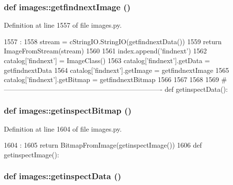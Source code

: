 \hypertarget{namespaceimages_a8bf08ffd31da9168b3f793df37e9dc76}{
\subsubsection[{getfindnextImage}]{\setlength{\rightskip}{0pt plus 5cm}def images::getfindnextImage ()}}
\label{namespaceimages_a8bf08ffd31da9168b3f793df37e9dc76}


Definition at line 1557 of file images.py.


\begin{DoxyCode}
1557                       :
1558     stream = cStringIO.StringIO(getfindnextData())
1559     return ImageFromStream(stream)
1560 
1561 index.append('findnext')
1562 catalog['findnext'] = ImageClass()
1563 catalog['findnext'].getData = getfindnextData
1564 catalog['findnext'].getImage = getfindnextImage
1565 catalog['findnext'].getBitmap = getfindnextBitmap
1566 
1567 
1568 
1569 #----------------------------------------------------------------------
def getinspectData():
\end{DoxyCode}
\hypertarget{namespaceimages_a95ac19ef30d8018606ae816f84d18d5b}{
\subsubsection[{getinspectBitmap}]{\setlength{\rightskip}{0pt plus 5cm}def images::getinspectBitmap ()}}
\label{namespaceimages_a95ac19ef30d8018606ae816f84d18d5b}


Definition at line 1604 of file images.py.


\begin{DoxyCode}
1604                       :
1605     return BitmapFromImage(getinspectImage())
1606 
def getinspectImage():
\end{DoxyCode}
\hypertarget{namespaceimages_a8aa9464fa73a856b468f24c33b98a0a5}{
\subsubsection[{getinspectData}]{\setlength{\rightskip}{0pt plus 5cm}def images::getinspectData ()}}
\label{namespaceimages_a8aa9464fa73a856b468f24c33b98a0a5}


